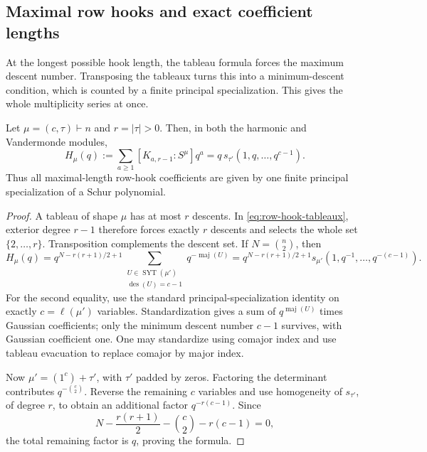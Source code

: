 \subsection{Maximal row hooks and exact coefficient lengths}

At the longest possible hook length, the tableau formula forces the
maximum descent number. Transposing the tableaux turns this into a
minimum-descent condition, which is counted by a finite principal
specialization. This gives the whole multiplicity series at once.

\begin{theorem}
\label{thm:maximal-hook-series}
Let $\mu=(c,\tau)\vdash n$ and $r=|\tau|>0$. Then, in both the
harmonic and Vandermonde modules,
\[
 H_\mu(q):=\sum_{a\ge1}[K_{a,r-1}:S^\mu]q^a
                         =q\,s_{\tau'}(1,q,\ldots,q^{c-1}).
\]
Thus all maximal-length row-hook coefficients are given by one finite
principal specialization of a Schur polynomial.
\end{theorem}
\begin{proof}
A tableau of shape $\mu$ has at most $r$ descents. In \eqref{eq:row-hook-tableaux}, exterior degree $r-1$ therefore forces exactly
$r$ descents and selects the whole set $\{2,\ldots,r\}$.
Transposition complements the descent set. If $N=\binom n2$, then
\[
 H_\mu(q)=q^{N-r(r+1)/2+1}
 \sum_{\substack{U\in\operatorname{SYT}(\mu')\\
                         \operatorname{des}(U)=c-1}}
      q^{-\operatorname{maj}(U)}
 =q^{N-r(r+1)/2+1}s_{\mu'}(1,q^{-1},\ldots,q^{-(c-1)}).
\]
For the second equality, use the standard principal-specialization
identity on exactly $c=\ell(\mu')$ variables. Standardization gives a
sum of $q^{\operatorname{maj}(U)}$ times Gaussian coefficients; only
the minimum descent number $c-1$ survives, with Gaussian coefficient
one. One may standardize using comajor index and use tableau evacuation
to replace comajor by major index.

Now $\mu'=(1^c)+\tau'$, with $\tau'$ padded by zeros. Factoring the
determinant contributes $q^{-\binom c2}$. Reverse the remaining $c$
variables and use homogeneity of $s_{\tau'}$, of degree $r$, to obtain
an additional factor $q^{-r(c-1)}$. Since
\[
 N-\frac{r(r+1)}2-\binom c2-r(c-1)=0,
\]
the total remaining factor is $q$, proving the formula.
\end{proof}

